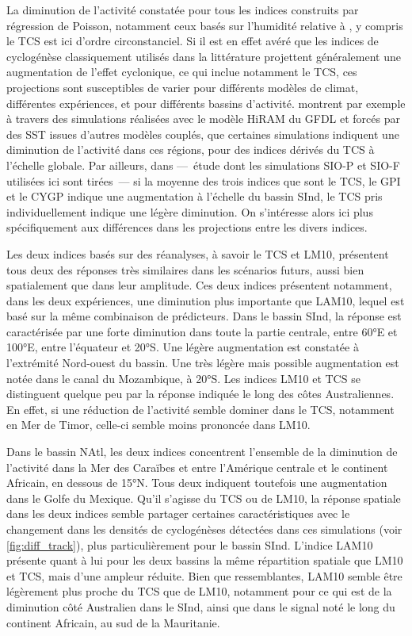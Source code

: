 \documentclass[../main.tex]{subfiles}
\begin{document}
La diminution de l'activité constatée pour tous les indices construits par régression de Poisson, notamment ceux basés sur l'humidité relative à , y
compris le TCS est ici d'ordre circonstanciel. Si il est en effet avéré que les indices de cyclogénèse classiquement utilisés dans la littérature projettent
généralement une augmentation de l'effet cyclonique, ce qui inclue notamment le TCS, ces projections sont susceptibles de varier pour différents modèles de
climat, différentes expériences, et pour différents bassins d'activité. \textcite{camargo_testing_2014} montrent par exemple à travers des simulations réalisées
avec le modèle HiRAM du GFDL \parencite{zhao_simulations_2009} et forcés par des SST issues d'autres modèles couplés, que certaines simulations indiquent une
diminution de l'activité dans ces régions, pour des indices dérivés du TCS à l'échelle globale. Par ailleurs, dans \textcite{cattiaux_projected_2020} ---~étude
dont les simulations SIO-P et SIO-F utilisées ici sont tirées~--- si la moyenne des trois indices que sont le TCS, le GPI et le CYGP indique une augmentation à
l'échelle du bassin SInd, le TCS pris individuellement indique une légère diminution. On s'intéresse alors ici plus spécifiquement aux différences dans les
projections entre les divers indices.

Les deux indices basés sur des réanalyses, à savoir le TCS et LM10, présentent tous deux des réponses très similaires dans les scénarios futurs, aussi bien
spatialement que dans leur amplitude. Ces deux indices présentent notamment, dans les deux expériences, une diminution plus importante que LAM10, lequel est
basé sur la même combinaison de prédicteurs. Dans le bassin SInd, la réponse est caractérisée par une forte diminution dans toute la partie centrale, entre
\ang{60}E et \ang{100}E, entre l'équateur et \ang{20}S. Une légère augmentation est constatée à l'extrémité Nord-ouest du bassin. Une très légère mais possible
augmentation est notée dans le canal du Mozambique, à \ang{20}S. Les indices LM10 et TCS se distinguent quelque peu par la réponse indiquée le long des côtes
Australiennes. En effet, si une réduction de l'activité semble dominer dans le TCS, notamment en Mer de Timor, celle-ci semble moins prononcée dans LM10.

Dans le bassin NAtl, les deux indices concentrent l'ensemble de la diminution de l'activité dans la Mer des Caraïbes et entre l'Amérique centrale et le
continent Africain, en dessous de \ang{15}N. Tous deux indiquent toutefois une augmentation dans le Golfe du Mexique. Qu'il s'agisse du TCS ou de LM10, la
réponse spatiale dans les deux indices semble partager certaines caractéristiques avec le changement dans les densités de cyclogénèses détectées dans ces
simulations (voir \cref{fig:diff_track}), plus particulièrement pour le bassin SInd. L'indice LAM10 présente quant à lui pour les deux bassins la même
répartition spatiale que LM10 et TCS, mais d'une ampleur réduite. Bien que ressemblantes, LAM10 semble être légèrement plus proche du TCS que de LM10, notamment
pour ce qui est de la diminution côté Australien dans le SInd, ainsi que dans le signal noté le long du continent Africain, au sud de la Mauritanie.
\end{document}
